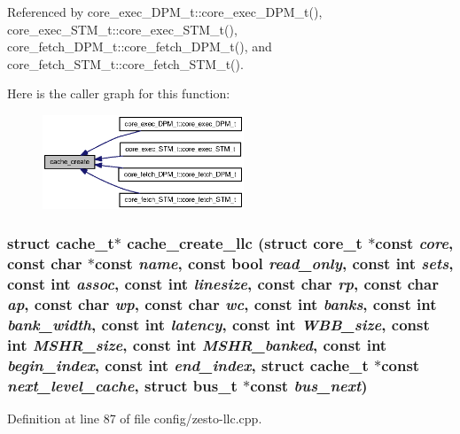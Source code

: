 Referenced by core\_\-exec\_\-DPM\_\-t::core\_\-exec\_\-DPM\_\-t(), core\_\-exec\_\-STM\_\-t::core\_\-exec\_\-STM\_\-t(), core\_\-fetch\_\-DPM\_\-t::core\_\-fetch\_\-DPM\_\-t(), and core\_\-fetch\_\-STM\_\-t::core\_\-fetch\_\-STM\_\-t().

Here is the caller graph for this function:\nopagebreak
\begin{figure}[H]
\begin{center}
\leavevmode
\includegraphics[width=170pt]{zesto-cache_8h_f37d0719955363306947d707ca6a56f3_icgraph}
\end{center}
\end{figure}
\subsubsection[{cache\_\-create\_\-llc}]{\setlength{\rightskip}{0pt plus 5cm}struct {\bf cache\_\-t}$\ast$ cache\_\-create\_\-llc (struct {\bf core\_\-t} $\ast$const  {\em core}, \/  const char $\ast$const  {\em name}, \/  const bool {\em read\_\-only}, \/  const int {\em sets}, \/  const int {\em assoc}, \/  const int {\em linesize}, \/  const char {\em rp}, \/  const char {\em ap}, \/  const char {\em wp}, \/  const char {\em wc}, \/  const int {\em banks}, \/  const int {\em bank\_\-width}, \/  const int {\em latency}, \/  const int {\em WBB\_\-size}, \/  const int {\em MSHR\_\-size}, \/  const int {\em MSHR\_\-banked}, \/  const int {\em begin\_\-index}, \/  const int {\em end\_\-index}, \/  struct {\bf cache\_\-t} $\ast$const  {\em next\_\-level\_\-cache}, \/  struct {\bf bus\_\-t} $\ast$const  {\em bus\_\-next})\hspace{0.3cm}{\tt  [read]}}\label{zesto-cache_8h_8e1bb5340056d589c19813cbc1ab6318}




Definition at line 87 of file config/zesto-llc.cpp.

